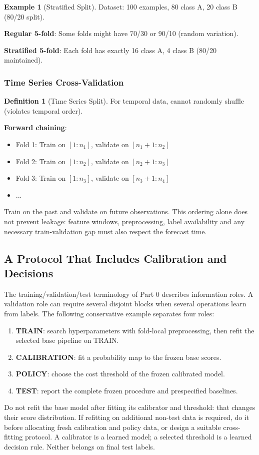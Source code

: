 \documentclass[11pt,twoside]{article}
\numberwithin{equation}{section}
\theoremstyle{plain}
\theoremstyle{definition}
\newtheorem{definition}[theorem]{Definition}
\newtheorem{example}[theorem]{Example}
\theoremstyle{remark}
\begin{document}
\begin{example}[Stratified Split]
Dataset: 100 examples, 80 class A, 20 class B (80/20 split).

\textbf{Regular 5-fold}: Some folds might have 70/30 or 90/10 (random variation).

\textbf{Stratified 5-fold}: Each fold has exactly 16 class A, 4 class B (80/20 maintained).
\end{example}

\subsubsection{Time Series Cross-Validation}

\begin{definition}[Time Series Split]
For temporal data, cannot randomly shuffle (violates temporal order).

\textbf{Forward chaining}:
\begin{itemize}
\item Fold 1: Train on $[1:n_1]$, validate on $[n_1+1:n_2]$
\item Fold 2: Train on $[1:n_2]$, validate on $[n_2+1:n_3]$
\item Fold 3: Train on $[1:n_3]$, validate on $[n_3+1:n_4]$
\item ...
\end{itemize}

Train on the past and validate on future observations. This ordering alone does not prevent leakage: feature windows, preprocessing, label availability and any necessary train-validation gap must also respect the forecast time.
\end{definition}

\subsection{A Protocol That Includes Calibration and Decisions}
\label{sec:four-block-protocol}
The training/validation/test terminology of Part 0 describes information roles.
A validation role can require several disjoint blocks when several operations
learn from labels. The following conservative example separates four roles:
\begin{enumerate}
\item \textbf{TRAIN}: search hyperparameters with fold-local preprocessing,
then refit the selected base pipeline on TRAIN.
\item \textbf{CALIBRATION}: fit a probability map to the frozen base scores.
\item \textbf{POLICY}: choose the cost threshold of the frozen calibrated model.
\item \textbf{TEST}: report the complete frozen procedure and prespecified baselines.
\end{enumerate}
Do not refit the base model after fitting its calibrator and threshold: that
changes their score distribution. If refitting on additional non-test data is
required, do it before allocating fresh calibration and policy data, or design
a suitable cross-fitting protocol. A calibrator is a learned model; a selected
threshold is a learned decision rule. Neither belongs on final test labels.
\end{document}
